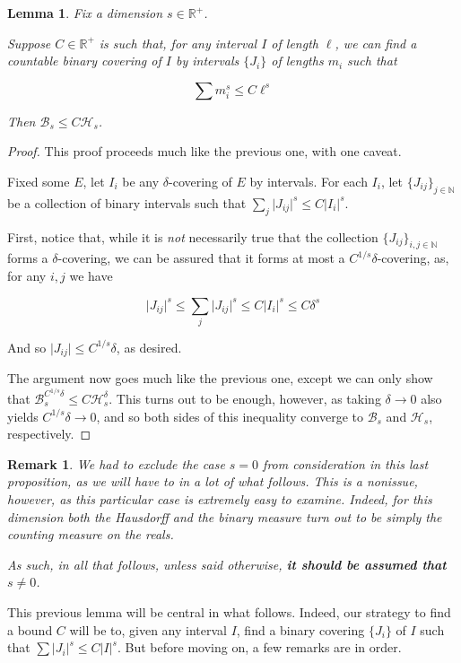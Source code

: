 \documentclass[11pt, reqno]{amsart}
\newcommand{\R}{\mathbb{R}}
\newcommand{\N}{\mathbb{N}}
\newcommand{\HH}{\mathcal{H}}
\newcommand{\BB}{\mathcal{B}}
\newtheorem{lemma}{Lemma}
\newtheorem{remark}{Remark}
\begin{document}
\begin{lemma}
Fix a dimension $s \in \R^+$.

Suppose $C \in \R^+$ is such that, for any interval $I$ of length $\ell$, we can find a countable binary covering of $I$ by intervals $\{J_i\}$ of lengths $m_i$ such that

\[\sum m_i^s \leq C \ell^s\]

Then $\BB_s \leq C \HH_s$.
\end{lemma}

\begin{proof}
This proof proceeds much like the previous one, with one caveat.

Fixed some $E$, let $I_i$ be any $\delta$-covering of $E$ by intervals. For each $I_i$, let $\{J_{ij}\}_{j \in \N}$ be a collection of binary intervals such that  $\sum_j \lvert J_{ij} \rvert^s \leq C \lvert I_i \rvert^s$.

First, notice that, while it is \emph{not} necessarily true that the collection $\{J_{ij}\}_{i,j \in \N}$ forms a $\delta$-covering, we can be assured that it forms at most a $C^{1/s}\delta$-covering, as, for any $i, j$ we have

\[ \lvert J_{ij} \rvert^s \leq \sum_j \lvert J_{ij} \rvert^s \leq C \lvert I_i \rvert^s \leq C \delta^s\]

And so $\lvert J_{ij} \rvert \leq C^{1/s} \delta$, as desired.

The argument now goes much like the previous one, except we can only show that $\BB_s^{C^{1/s} \delta} \leq C \HH_s^\delta$. This turns out to be enough, however, as taking $\delta \to 0$ also yields $C^{1/s} \delta \to 0$, and so both sides of this inequality converge to $\BB_s$ and $\HH_s$, respectively.
\end{proof}

\begin{remark} \label{dimnotzero}
We had to exclude the case $s = 0$ from consideration in this last proposition, as we will have to in a lot of what follows. This is a nonissue, however, as this particular case is extremely easy to examine. Indeed, for this dimension both the Hausdorff and the binary measure turn out to be simply the counting measure on the reals.

As such, in all that follows, unless said otherwise, \textbf{it should be assumed that $s \neq 0$}.
\end{remark}

This previous lemma will be central in what follows. Indeed, our strategy to find a bound $C$ will be to, given any interval $I$, find a binary covering $\{J_i\}$ of $I$ such that $\sum \lvert J_i \rvert^s \leq C \lvert I \rvert^s$. But before moving on, a few remarks are in order.
\end{document}

